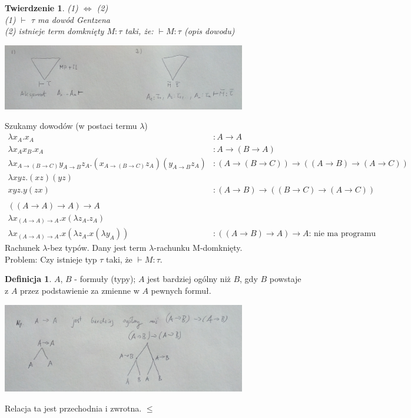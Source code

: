 \documentclass[10pt,a4paper]{article}
\theoremstyle{plain}
\newtheorem{theorem}{Twierdzenie}
\theoremstyle{definition}
\newtheorem*{definition}{Definicja}
\begin{document}
\begin{theorem}
(1) $\iff$ (2)\\
(1) $\vdash$ $\tau$ ma dowód Gentzena\\
(2) istnieje term domknięty $M:\tau$ taki, że: $\vdash M:\tau$ (opis dowodu)
\end{theorem}
\begin{center}
\includegraphics[width=0.8\textwidth]{img/typowaneWyprowadzenie}
\end{center}
Szukamy dowodów (w postaci termu $\lambda$)
\begin{align*}
\lambda x_A . x_A &: A \rightarrow A\\
\lambda x_A x_B . x_A &: A \rightarrow (B \rightarrow A)\\
\lambda x_{A\rightarrow (B\rightarrow C)} y_{A\rightarrow B} z_A
	.(x_{A\rightarrow (B\rightarrow C)}z_{A})(y_{A\rightarrow B}z_{A}) &:
	(A \rightarrow (B \rightarrow C))\rightarrow
		((A \rightarrow B) \rightarrow (A \rightarrow C)) \\
\lambda xyz . (xz)(yz) &\\
xyz . y(zx) 
	&: (A \rightarrow B) \rightarrow
		(( B \rightarrow C) \rightarrow ( A \rightarrow C)) \\
\\
((A\rightarrow A)\rightarrow A)\rightarrow A &\\
\lambda x_{(A\rightarrow A)\rightarrow A} . x (\lambda z_A . z_A) &\\
\lambda x_{(A \rightarrow A) \rightarrow A} . x (\lambda z_A . x(\lambda y_A)) & :
((A \rightarrow B)\rightarrow A) \rightarrow A \text{: nie ma programu}
\end{align*}
Rachunek $\lambda$-bez typów.
Dany jest term $\lambda$-rachunku M-domknięty.\\
Problem: Czy istnieje typ $\tau$ taki, że $\vdash M : \tau$.
\begin{definition}
$A$, $B$ - formuły (typy); $A$ jest bardziej ogólny niż $B$, gdy $B$ powstaje z $A$ przez podstawienie za zmienne w $A$ pewnych formuł.
\begin{center}
\includegraphics[width=0.8\textwidth]{img/podstawienieZmiennych}
\end{center}
Relacja ta jest przechodnia i zwrotna. $\leq$
\end{definition}
\end{document}
